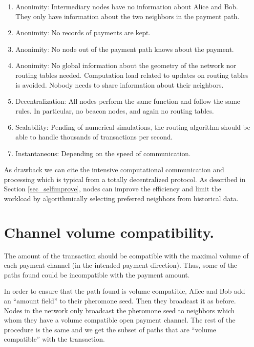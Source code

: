 \documentclass[12pt]{amsart}
\theoremstyle{remark}
\begin{document}
\begin{enumerate}
 \item Anonimity: Intermediary nodes have no information about Alice and Bob. 
 They only have information about the two neighbors in the payment path.
 \item Anonimity: No records of payments are kept.
 \item Anonimity: No node out of the payment path knows about the payment.
 \item Anonimity: No global information about the geometry of the network nor routing tables needed. 
 Computation load related to updates on routing tables is avoided. Nobody 
 needs to share information about their neighbors.
 \item Decentralization: All nodes perform the same function and follow the same rules. 
 In particular, no beacon nodes, and again no routing tables. 
 \item Scalability: Pending of numerical simulations, the routing algorithm should be able 
 to handle thousands of transactions per second.
 \item Instantaneous: Depending on the speed of communication.
\end{enumerate}


As drawback we can cite the intensive computational communication and processing which is typical from 
a totally decentralized protocol. As described in Section \ref{sec_selfimprove}, nodes can improve the efficiency and 
limit the workload by algorithmically selecting preferred neighbors from historical data. 


\section{Channel volume compatibility.}\label{sec_volume}


The amount of the transaction should be compatible with the maximal volume of each payment channel (in the 
intended payment direction). Thus, some of the paths found could be incompatible with the payment amount.

\medskip

In order to ensure that the path found is volume compatible, Alice and Bob add an ``amount field'' to their 
pheromone seed. Then they broadcast it as before. Nodes in the network only broadcast the pheromone seed to 
neighbors which whom they have a volume compatible open payment channel. The rest of the procedure is the 
same and we get the subset of paths that are ``volume compatible'' with the transaction.
\end{document}
